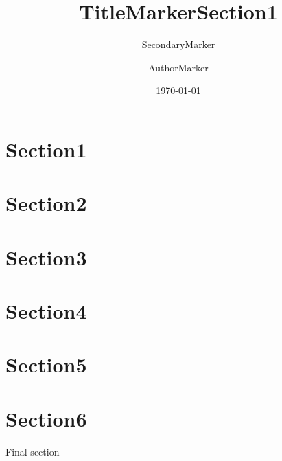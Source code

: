 \documentclass{nbeamer}
\title{TitleMarker}
\subtitle{SecondaryMarker}
\author{AuthorMarker}
\institute{InstituteMarker}
\date{\today}
\begin{document}
\begin{frame}
  \titlepage
\end{frame}

\begin{frame}
  \title{Section1}
\end{frame}

\section{Section1}
\begin{frame}
  \sectionpage
\end{frame}
\section{Section2}
\section{Section3}
\section{Section4}
\section{Section5}
\section{Section6}
\begin{frame}Final section\end{frame}
\end{document}
